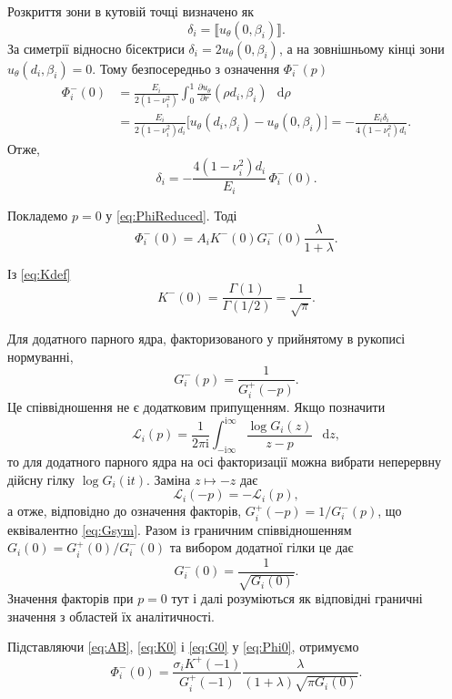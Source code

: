 \documentclass[12pt,a4paper]{article}
\newcommand{\ii}{\mathrm{i}}
\newcommand{\dd}{\mathop{}\!\mathrm{d}}
\newcommand{\jump}[1]{\llbracket #1\rrbracket}
\begin{document}
Розкриття зони в кутовій точці визначено як
\[
  \delta_i=\jump{u_\theta(0,\beta_i)}.
\]
За симетрії відносно бісектриси
$\delta_i=2u_\theta(0,\beta_i)$, а на зовнішньому кінці зони
$u_\theta(d_i,\beta_i)=0$. Тому безпосередньо з означення
$\Phi_i^-(p)$
\begin{align*}
  \Phi_i^-(0)
  &=
  \frac{E_i}{2(1-\nu_i^2)}
  \int_0^1
  \frac{\partial u_\theta}{\partial r}(\rho d_i,\beta_i)
  \,\dd\rho
  \\
  &=
  \frac{E_i}{2(1-\nu_i^2)d_i}
  \bigl[u_\theta(d_i,\beta_i)-u_\theta(0,\beta_i)\bigr]
  =
  -\frac{E_i\delta_i}{4(1-\nu_i^2)d_i}.
\end{align*}
Отже,
\begin{equation}
\label{eq:deltaPhi}
  \delta_i
  =
  -\frac{4(1-\nu_i^2)d_i}{E_i}\,
  \Phi_i^-(0).
\end{equation}

Покладемо $p=0$ у \eqref{eq:PhiReduced}. Тоді
\begin{equation}
\label{eq:Phi0}
  \Phi_i^-(0)
  =
  A_iK^-(0)G_i^-(0)
  \frac{\lambda}{1+\lambda}.
\end{equation}

Із \eqref{eq:Kdef}
\begin{equation}
\label{eq:K0}
  K^-(0)
  =
  \frac{\Gamma(1)}{\Gamma(1/2)}
  =
  \frac{1}{\sqrt{\pi}}.
\end{equation}

Для додатного парного ядра, факторизованого у прийнятому в рукописі
нормуванні,
\begin{equation}
\label{eq:Gsym}
  G_i^-(p)=\frac{1}{G_i^+(-p)}.
\end{equation}
Це співвідношення не є додатковим припущенням. Якщо позначити
\[
  \mathcal{L}_i(p)=
  \frac{1}{2\pi\ii}
  \int_{-\ii\infty}^{\ii\infty}
  \frac{\log G_i(z)}{z-p}\,\dd z,
\]
то для додатного парного ядра на осі факторизації можна вибрати
неперервну дійсну гілку $\log G_i(\ii t)$. Заміна $z\mapsto-z$
дає
\[
  \mathcal{L}_i(-p)=-\mathcal{L}_i(p),
\]
а отже, відповідно до означення факторів,
$G_i^+(-p)=1/G_i^-(p)$, що еквівалентно \eqref{eq:Gsym}.
Разом із граничним співвідношенням
$G_i(0)=G_i^+(0)/G_i^-(0)$ та вибором додатної гілки це дає
\begin{equation}
\label{eq:G0}
  G_i^-(0)=\frac{1}{\sqrt{G_i(0)}}.
\end{equation}
Значення факторів при $p=0$ тут і далі розуміються як відповідні
граничні значення з областей їх аналітичності.

Підставляючи \eqref{eq:AB}, \eqref{eq:K0} і \eqref{eq:G0}
у \eqref{eq:Phi0}, отримуємо
\begin{equation}
\label{eq:Phi0Final}
  \Phi_i^-(0)
  =
  \frac{\sigma_iK^+(-1)}
       {G_i^+(-1)}
  \frac{\lambda}
       {(1+\lambda)\sqrt{\pi G_i(0)}}.
\end{equation}
\end{document}
